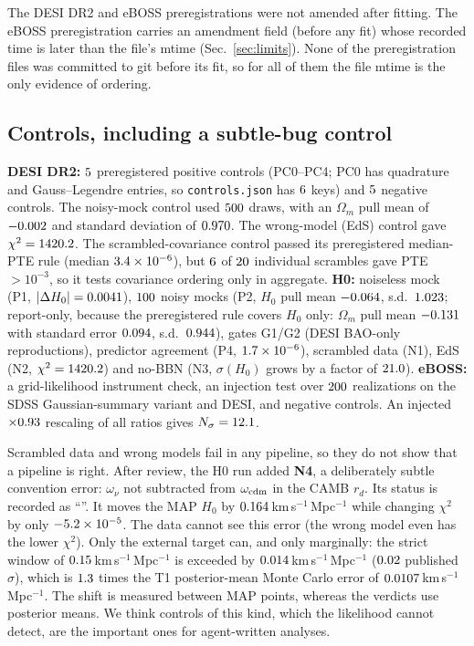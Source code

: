\documentclass[11pt]{article}
\newcommand{\kms}{km\,s$^{-1}$\,Mpc$^{-1}$}
\begin{document}
The DESI DR2 and eBOSS preregistrations were not amended after fitting. The eBOSS preregistration carries an amendment field
(before any fit) whose recorded time is later than the file's mtime (Sec.~\ref{sec:limits}). None of the preregistration files was
committed to git before its fit, so for all of them the file mtime is the only evidence of ordering.

\subsection{Controls, including a subtle-bug control}
\textbf{DESI DR2:} $5$ preregistered positive controls (PC0--PC4; PC0 has quadrature and Gauss--Legendre entries, so
\texttt{controls.json} has $6$ keys) and $5$ negative controls. The noisy-mock control used $500$ draws, with an $\Omega_m$
pull mean of $-0.002$ and standard deviation of $0.970$. The wrong-model (EdS) control gave $\chi^2=1420.2$. The
scrambled-covariance control passed its preregistered median-PTE rule (median $3.4\times10^{-6}$), but $6$ of $20$
individual scrambles gave PTE $>10^{-3}$, so it tests covariance ordering only in aggregate.
\textbf{H0:} noiseless mock (P1, $|\Delta H_0|=0.0041$), $100$ noisy mocks (P2, $H_0$ pull mean $-0.064$, s.d.\ $1.023$; report-only, because the preregistered rule covers $H_0$ only: $\Omega_m$ pull mean $-0.131$ with standard error $0.094$, s.d.\ $0.944$), gates
G1/G2 (DESI BAO-only reproductions), predictor agreement (P4, $1.7\times10^{-6}$), scrambled data (N1), EdS (N2, $\chi^2=1420.2$) and no-BBN
(N3, $\sigma(H_0)$ grows by a factor of $21.0$).
\textbf{eBOSS:} a grid-likelihood instrument check, an injection test over $200$ realizations on the SDSS Gaussian-summary
variant and DESI, and negative controls. An injected $\times0.93$ rescaling of all ratios gives $N_\sigma=12.1$.

Scrambled data and wrong models fail in any pipeline, so they do not show that a pipeline is right. After review, the H0 run added
\textbf{N4}, a deliberately subtle convention error: $\omega_\nu$ not subtracted from $\omega_{\rm cdm}$ in the CAMB $r_d$. Its status is
recorded as ``\hzNfourStatus''. It moves the MAP $H_0$ by $0.164$\,\kms{} while changing $\chi^2$ by only $-5.2\times10^{-5}$. The data cannot
see this error (the wrong model even has the lower $\chi^2$). Only the external target can, and only marginally: the strict window of
$0.15$\,\kms{} is exceeded by $0.014$\,\kms{} ($0.02$ published $\sigma$), which is $1.3$ times the T1 posterior-mean
Monte Carlo error of $0.0107$\,\kms. The shift is measured between MAP points, whereas the verdicts use posterior means. We think controls
of this kind, which the likelihood cannot detect, are the important ones for agent-written analyses.
\end{document}
